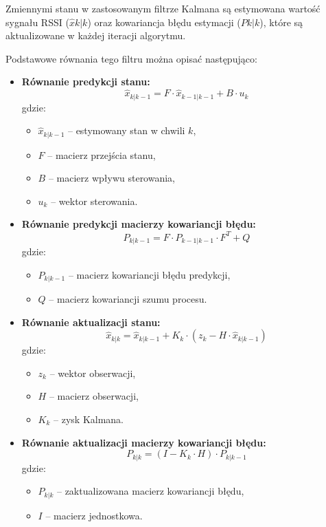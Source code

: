 Zmiennymi stanu w zastosowanym filtrze Kalmana są estymowana wartość sygnału RSSI ($\hat{x}{k|k}$) oraz kowariancja błędu estymacji ($P{k|k}$), które są aktualizowane w każdej iteracji algorytmu.

Podstawowe równania tego filtru można opisać następująco:

\begin{itemize}
    \item \textbf{Równanie predykcji stanu:}
    \begin{equation}
    \hat{x}_{k|k-1} = F \cdot \hat{x}_{k-1|k-1} + B \cdot u_k
    \end{equation}
    gdzie:
    \begin{itemize}
        \item $\hat{x}_{k|k-1}$ – estymowany stan w chwili $k$,
        \item $F$ – macierz przejścia stanu,
        \item $B$ – macierz wpływu sterowania,
        \item $u_k$ – wektor sterowania.
    \end{itemize}
    
    \item \textbf{Równanie predykcji macierzy kowariancji błędu:}
    \begin{equation}
    P_{k|k-1} = F \cdot P_{k-1|k-1} \cdot F^T + Q
    \end{equation}
    gdzie:
    \begin{itemize}
        \item $P_{k|k-1}$ – macierz kowariancji błędu predykcji,
        \item $Q$ – macierz kowariancji szumu procesu.
    \end{itemize}
    
    \item \textbf{Równanie aktualizacji stanu:}
    \begin{equation}
    \hat{x}_{k|k} = \hat{x}_{k|k-1} + K_k \cdot (z_k - H \cdot \hat{x}_{k|k-1})
    \end{equation}
    gdzie:
    \begin{itemize}
        \item $z_k$ – wektor obserwacji,
        \item $H$ – macierz obserwacji,
        \item $K_k$ – zysk Kalmana.
    \end{itemize}
    
    \item \textbf{Równanie aktualizacji macierzy kowariancji błędu:}
    \begin{equation}
    P_{k|k} = (I - K_k \cdot H) \cdot P_{k|k-1}
    \end{equation}
    gdzie:
    \begin{itemize}
        \item $P_{k|k}$ – zaktualizowana macierz kowariancji błędu,
        \item $I$ – macierz jednostkowa.
    \end{itemize}
\end{itemize}

